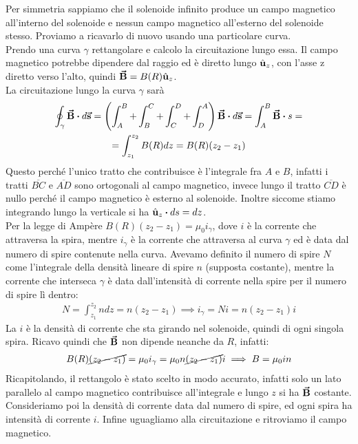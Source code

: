 \begin{examplewt}
	Per simmetria sappiamo che il solenoide infinito produce un campo magnetico all'interno del solenoide e nessun campo magnetico all'esterno del solenoide stesso. Proviamo a ricavarlo di nuovo usando una particolare curva.\\
	Prendo una curva $\gamma$ rettangolare e calcolo la circuitazione lungo essa. Il campo magnetico potrebbe dipendere dal raggio ed è diretto lungo $\hat{\mathbf{u}}_z$, con l'asse z diretto verso l'alto, quindi $\vb*{\va{B}}=B(R)\hat{\mathbf{u}}_z$.\\
	La circuitazione lungo la curva $\gamma$ sarà
		\begin{gather*}
			\oint_\gamma \vba B\vdot d\vba s=\left( \int^B_A + \int_B^C + \int^D_C + \int^A_D  \right) \vba B\vdot d\vba s= \int^B_A \vba B\vdot s=\\
			=\int^{z_2}_{z_1} B(R)dz=B(R)(z_2-z_1)
		\end{gather*}
	Questo perché l'unico tratto che contribuisce è l'integrale fra $A$ e $B$, infatti i tratti $\overline{BC}$ e $\overline{AD}$ sono ortogonali al campo magnetico, invece lungo il tratto $\overline{CD}$ è nullo perché il campo magnetico è esterno al solenoide. Inoltre siccome stiamo integrando lungo la verticale si ha $\vbh{u}_z\vdot ds=dz$.\\
	Per la legge di Ampère $B(R)(z_2-z_1)=\mu_0 i_\gamma$, dove $i$ è la corrente che attraversa la spira, mentre $i_\gamma$ è la corrente che attraversa al curva $\gamma$ ed è data dal numero di spire contenute nella curva. Avevamo definito il numero di spire $N$ come l'integrale della densità lineare di spire $n$ (supposta costante), mentre la corrente che interseca $\gamma$ è data dall'intensità di corrente nella spire per il numero di spire lì dentro:
		\begin{gather*}
			N=\int^{z_2}_{z_1}ndz = n(z_2-z_1) \implies i_\gamma=Ni=n(z_2-z_1)i
		\end{gather*}
	La $i$ è la densità di corrente che sta girando nel solenoide, quindi di ogni singola spira. Ricavo quindi che $\vb*{\va{B}}$ non dipende neanche da $R$, infatti:
		\begin{gather*}
			B(R)\cancel{(z_2-z_1)}=\mu_0 i_\gamma= \mu_0n\cancel{(z_2-z_1)}i \implies B=\mu_0 i n
		\end{gather*}
	Ricapitolando, il rettangolo è stato scelto in modo accurato, infatti solo un lato parallelo al campo magnetico contribuisce all'integrale e lungo $z$ si ha $\vb*{\va{B}}$ costante. Consideriamo poi la densità di corrente data dal numero di spire, ed ogni spira ha intensità di corrente $i$. Infine uguagliamo alla circuitazione e ritroviamo il campo magnetico.	
\end{examplewt}

